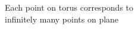 \documentclass[preview]{standalone}
\begin{document}
\begin{center}
Each point on torus corresponds to\\infinitely many points on plane
\end{center}
\end{document}
